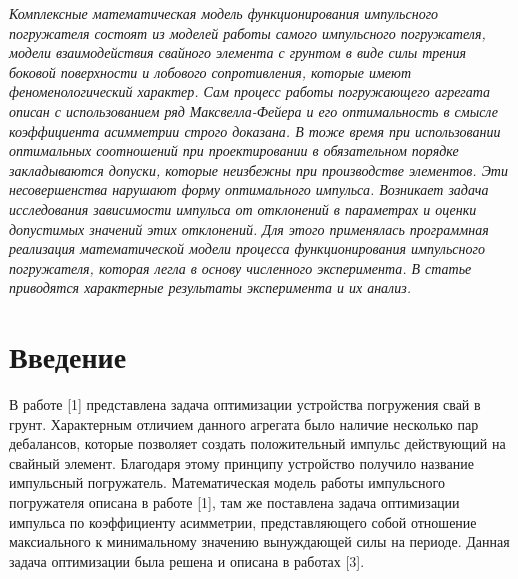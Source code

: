 
\vzmscaption

\textit{Комплексные математическая модель функционирования импульсного погружателя состоят из моделей работы самого импульсного погружателя, модели взаимодействия свайного элемента с грунтом в виде силы трения боковой поверхности и лобового сопротивления,
которые имеют феноменологический характер. Сам процесс работы погружающего агрегата описан с использованием ряд Максвелла-Фейера и его оптимальность в смысле коэффициента асимметрии строго доказана.
В тоже время при использовании оптимальных соотношений при проектировании в обязательном порядке закладываются допуски, которые неизбежны при производстве элементов. Эти несовершенства нарушают форму оптимального импульса.\linebreak
Возникает задача исследования зависимости импульса от отклонений в параметрах и оценки допустимых значений этих отклонений. Для этого применялась программная реализация математической модели процесса функционирования импульсного погружателя,
которая легла в основу численного эксперимента. В статье приводятся характерные результаты эксперимента и их анализ.}


\section{Введение}

В работе [1] представлена задача оптимизации устройства погружения свай в грунт. Характерным отличием данного агрегата было наличие несколько пар дебалансов, которые позволяет создать положительный импульс действующий на свайный элемент.
Благодаря этому принципу устройство получило название импульсный погружатель. Математическая модель работы импульсного погружателя описана в работе [1], там же поставлена задача оптимизации импульса по коэффициенту асимметрии,
представляющего собой отношение максиального к минимальному значению вынуждающей силы на периоде. Данная задача оптимизации была решена и описана в работах [3].

